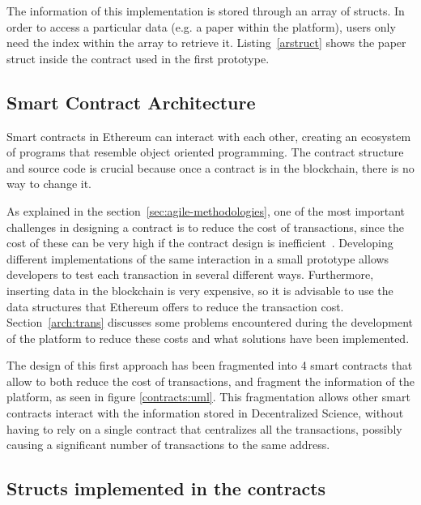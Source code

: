 The information of this implementation is stored through an array of structs. In
order to access a particular data (e.g. a paper within the platform), users only
need the index within the array to retrieve it. Listing~\ref{arstruct} shows the
paper struct inside the  contract used in the first prototype.



\subsection*{Smart Contract Architecture}
\label{arch:sca}

Smart contracts in Ethereum can interact with each other, creating an ecosystem
of programs that resemble object oriented programming. The contract structure
and source code is crucial because once a contract is in the blockchain, there
is no way to change it.

As explained in the section~\ref{sec:agile-methodologies}, one of the most
important challenges in designing a contract is to reduce the cost of
transactions, since the cost of these can be very high if the contract design is
inefficient~\cite{croman2016scaling}. Developing different implementations of
the same interaction in a small prototype allows developers to test each
transaction in several different ways. Furthermore, inserting data in the
blockchain is very expensive, so it is advisable to use the data structures that
Ethereum offers to reduce the transaction cost. Section~\ref{arch:trans}
discusses some problems encountered during the development of the platform to
reduce these costs and what solutions have been implemented.


The design of this first approach has been fragmented into 4 smart contracts
that allow to both reduce the cost of transactions, and fragment the information
of the platform, as seen in figure \ref{contracts:uml}. This fragmentation
allows other smart contracts interact with the information stored in
Decentralized Science, without having to rely on a single contract that
centralizes all the transactions, possibly causing a significant number of
transactions to the same address.

\subsection*{Structs implemented in the contracts}
\label{sec:structs-impl-contr}

